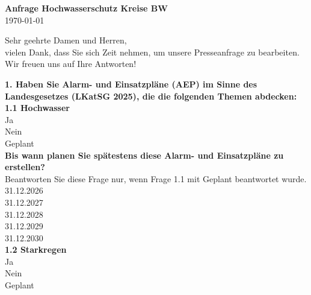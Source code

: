 \documentclass[12pt]{article}
\begin{document}
  \begin{center}
  {\LARGE \textbf{\textcolor{swr_purple}{Anfrage Hochwasserschutz Kreise BW}}}\\[1em]
  {\large \today}
  \end{center}
  {Sehr geehrte Damen und Herren,\\ vielen Dank, dass Sie sich
  Zeit nehmen, um unsere Presseanfrage zu bearbeiten.\\
  Wir freuen uns auf Ihre Antworten!}

  \vspace{1cm}

  \begin{Form}
  \needspace{5cm}
\large \textbf{\textcolor{swr_purple}{1. Haben Sie Alarm- und Einsatzpläne (AEP) im Sinne des Landesgesetzes (LKatSG 2025), die die folgenden Themen abdecken:}}\normalsize\\[0.5em]

\needspace{5cm}
\large \textbf{\textcolor{swr_purple}{1.1 Hochwasser}}\normalsize\\[0.5em]
\ChoiceMenu[radio, name=q_G01Q02, bordercolor={0.7 0.7 0.7}]{}{= } Ja\\
\ChoiceMenu[radio, name=q_G01Q02, bordercolor={0.7 0.7 0.7}]{}{= } Nein\\
\ChoiceMenu[radio, name=q_G01Q02, bordercolor={0.7 0.7 0.7}]{}{= } Geplant\\

\needspace{5cm}
\large \textbf{\textcolor{swr_purple}{Bis wann planen Sie spätestens diese Alarm- und Einsatzpläne zu erstellen?}}\normalsize\\[0.5em]
 Beantworten Sie diese Frage nur, wenn Frage 1.1 mit Geplant beantwortet wurde.\\[0.5em]
\ChoiceMenu[radio, name=q_G01Q03, bordercolor={0.7 0.7 0.7}]{}{= } 31.12.2026\\
\ChoiceMenu[radio, name=q_G01Q03, bordercolor={0.7 0.7 0.7}]{}{= } 31.12.2027\\
\ChoiceMenu[radio, name=q_G01Q03, bordercolor={0.7 0.7 0.7}]{}{= } 31.12.2028\\
\ChoiceMenu[radio, name=q_G01Q03, bordercolor={0.7 0.7 0.7}]{}{= } 31.12.2029\\
\ChoiceMenu[radio, name=q_G01Q03, bordercolor={0.7 0.7 0.7}]{}{= } 31.12.2030\\

\needspace{5cm}
\large \textbf{\textcolor{swr_purple}{1.2 Starkregen}}\normalsize\\[0.5em]
\ChoiceMenu[radio, name=q_G01Q04, bordercolor={0.7 0.7 0.7}]{}{= } Ja\\
\ChoiceMenu[radio, name=q_G01Q04, bordercolor={0.7 0.7 0.7}]{}{= } Nein\\
\ChoiceMenu[radio, name=q_G01Q04, bordercolor={0.7 0.7 0.7}]{}{= } Geplant\\


\end{Form}
\end{document}
